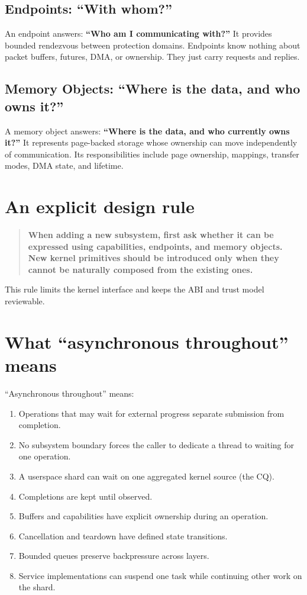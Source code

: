 \subsection{Endpoints: ``With whom?''}

An endpoint answers: \textbf{``Who am I communicating with?''} It provides
bounded rendezvous between protection domains. Endpoints know nothing about packet
buffers, futures, DMA, or ownership. They just carry requests and replies.

\subsection{Memory Objects: ``Where is the data, and who owns it?''}

A memory object answers: \textbf{``Where is the data, and who currently owns
it?''} It represents page-backed storage whose ownership can move independently of
communication. Its responsibilities include page ownership, mappings, transfer
modes, DMA state, and lifetime.

\section{An explicit design rule}

\begin{quote}
\textbf{When adding a new subsystem, first ask whether it can be expressed using
capabilities, endpoints, and memory objects. New kernel primitives should be
introduced only when they cannot be naturally composed from the existing ones.}
\end{quote}

This rule limits the kernel interface and keeps the ABI and trust model reviewable.

\section{What ``asynchronous throughout'' means}

``Asynchronous throughout'' means:

\begin{enumerate}
    \item Operations that may wait for external progress separate submission from completion.
    \item No subsystem boundary forces the caller to dedicate a thread to waiting
        for one operation.
    \item A userspace shard can wait on one aggregated kernel source (the CQ).
    \item Completions are kept until observed.
    \item Buffers and capabilities have explicit ownership during an operation.
    \item Cancellation and teardown have defined state transitions.
    \item Bounded queues preserve backpressure across layers.
    \item Service implementations can suspend one task while continuing other work
        on the shard.
\end{enumerate}


